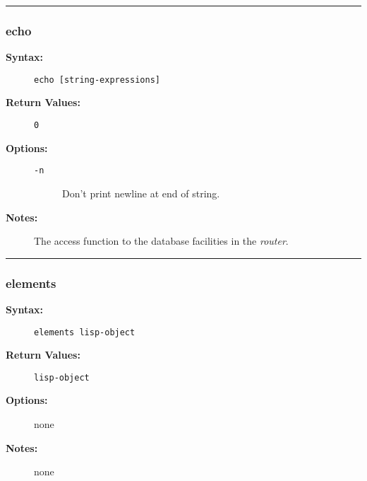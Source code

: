 \hrule
\subsubsection{echo}

\begin{description}
\item[{\bf Syntax:}] \mbox{}

{\tt echo [string-expressions]}

\item[{\bf Return Values:}] \mbox{}

\begin{description}
\item[{\tt 0}] \mbox{}

        

\end{description}


\item[{\bf Options:}] \mbox{}

\begin{description}
\item[{\tt -n}] \mbox{}

Don't print newline at end of string.

\end{description}


\item[{\bf Notes:}] \mbox{}

The access function to the database facilities in the 
{\em router\/}.

\end{description}


\hrule
\subsubsection{elements}

\begin{description}
\item[{\bf Syntax:}] \mbox{}

{\tt elements lisp-object}

\item[{\bf Return Values:}] \mbox{}

{\tt lisp-object}

\item[{\bf Options:}] \mbox{}

none  

\item[{\bf Notes:}] \mbox{}

none

\end{description}


